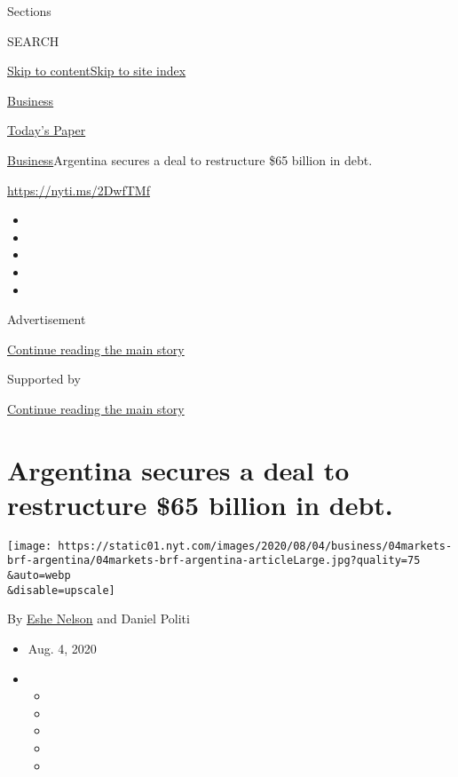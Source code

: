 Sections

SEARCH

\protect\hyperlink{site-content}{Skip to
content}\protect\hyperlink{site-index}{Skip to site index}

\href{https://www.nytimes.com/section/business}{Business}

\href{https://myaccount.nytimes.com/auth/login?response_type=cookie\&client_id=vi}{}

\href{https://www.nytimes.com/section/todayspaper}{Today's Paper}

\href{/section/business}{Business}\textbar{}Argentina secures a deal to
restructure \$65 billion in debt.

\url{https://nyti.ms/2DwfTMf}

\begin{itemize}
\item
\item
\item
\item
\item
\end{itemize}

Advertisement

\protect\hyperlink{after-top}{Continue reading the main story}

Supported by

\protect\hyperlink{after-sponsor}{Continue reading the main story}

\hypertarget{argentina-secures-a-deal-to-restructure-65-billion-in-debt}{%
\section{Argentina secures a deal to restructure \$65 billion in
debt.}\label{argentina-secures-a-deal-to-restructure-65-billion-in-debt}}

\texttt{[image: https://static01.nyt.com/images/2020/08/04/business/04markets-brf-argentina/04markets-brf-argentina-articleLarge.jpg?quality=75\\\&auto=webp\\\&disable=upscale]}

By \href{https://www.nytimes.com/by/eshe-nelson}{Eshe Nelson} and Daniel
Politi

\begin{itemize}
\item
  Aug. 4, 2020
\item
  \begin{itemize}
  \item
  \item
  \item
  \item
  \item
  \end{itemize}
\end{itemize}

